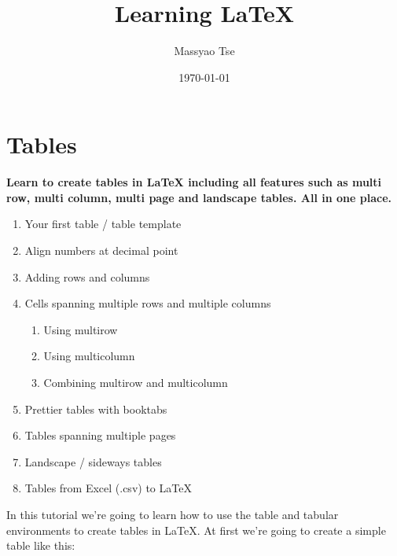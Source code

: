 \documentclass{article}
\begin{document}
\author{Massyao Tse}
\title{Learning \LaTeX{}}
\date{\today{}} %


\maketitle{} %
\newpage

\tableofcontents{} %


% 

% 

% 

% 

% 

% 

% 


\maketitle
\newpage
\section{Tables}
  \textbf{
    Learn to create tables in LaTeX including all features such as multi row, multi column, multi page and landscape tables. All in one place.
  }
  \begin{enumerate} %
    \item Your first table / table template
    \item Align numbers at decimal point
    \item Adding rows and columns
    \item Cells spanning multiple rows and multiple columns
      \begin{enumerate}
        \item Using multirow
        \item Using multicolumn
        \item Combining multirow and multicolumn
      \end{enumerate}
    \item Prettier tables with booktabs
    \item Tables spanning multiple pages
    \item Landscape / sideways tables
    \item Tables from Excel (.csv) to LaTeX
  \end{enumerate} 
  In this tutorial we're going to learn how to use the table and tabular environments to create tables in LaTeX. At first we're going to create a simple table like this:
  
\end{document}
